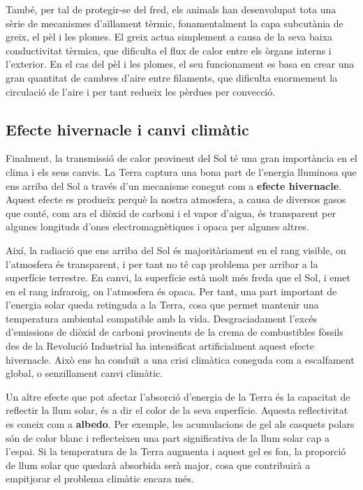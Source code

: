\documentclass[12pt]{book}
\begin{document}
També, per tal de protegir-se del fred, els animals han desenvolupat tota una sèrie de mecanismes d'aïllament tèrmic, fonamentalment la capa subcutània de greix, el pèl i les plomes. El greix actua simplement a causa de la seva baixa conductivitat tèrmica, que dificulta el flux de calor entre els òrgans interns i l'exterior. En el cas del pèl i les plomes, el seu funcionament es basa en crear una gran quantitat de cambres d'aire entre filaments, que dificulta enormement la circulació de l'aire i per tant redueix les pèrdues per convecció.

\subsection{Efecte hivernacle i canvi climàtic}

Finalment, la transmissió de calor provinent del Sol té una gran importància en el clima i els seus canvis. La Terra captura una bona part de l'energia lluminosa que ens arriba del Sol a través d'un mecanisme conegut com a {\bf efecte hivernacle}. Aquest efecte es produeix perquè la nostra atmosfera, a causa de diversos gasos que conté, com ara el diòxid de carboni i el vapor d'aigua, és transparent per algunes longituds d'ones electromagnètiques i opaca per algunes altres. 

Així, la radiació que ens arriba del Sol és majoritàriament en el rang visible, on l'atmosfera és transparent, i per tant no té cap problema per arribar a la superfície terrestre. En canvi, la superfície està molt més freda que el Sol, i emet en el rang infraroig, on l'atmosfera és opaca. Per tant, una part important de l'energia solar queda retinguda a la Terra, cosa que permet mantenir una temperatura ambiental compatible amb la vida. Desgraciadament l'excés d'emissions de diòxid de carboni provinents de la crema de combustibles fòssils des de la Revolució Industrial ha intensificat artificialment aquest efecte hivernacle. Això ens ha conduït a una crisi climàtica coneguda com a escalfament global, o senzillament canvi climàtic.

Un altre efecte que pot afectar l'absorció d'energia de la Terra és la capacitat de reflectir la llum solar, és a dir el color de la seva superfície. Aquesta reflectivitat es coneix com a {\bf albedo}. Per exemple, les acumulacions de gel als casquets polars són de color blanc i reflecteixen una part significativa de la llum solar cap a l'espai. Si la temperatura de la Terra augmenta i aquest gel es fon, la proporció de llum solar que quedarà absorbida serà major, cosa que contribuirà a empitjorar el problema climàtic encara més. 
\end{document}
